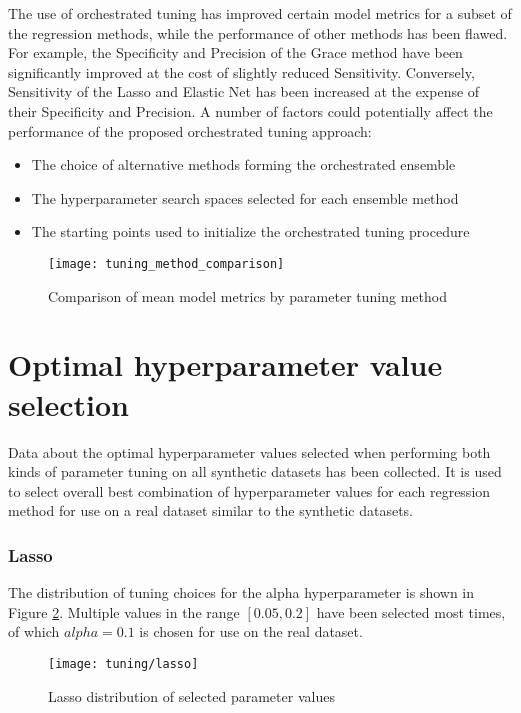 

The use of orchestrated tuning has improved certain model metrics for a subset of the regression methods, while the performance of other methods has been flawed. For example, the Specificity and Precision of the Grace method have been significantly improved at the cost of slightly reduced Sensitivity. Conversely, Sensitivity of the Lasso and Elastic Net has been increased at the expense of their Specificity and Precision. A number of factors could potentially affect the performance of the proposed orchestrated tuning approach:
\begin{itemize}
	\item The choice of alternative methods forming the orchestrated ensemble
	\item The hyperparameter search spaces selected for each ensemble method
	\item The starting points used to initialize the orchestrated tuning procedure
\end{itemize}

\begin{figure}[H]
	\centering
	\texttt{[image: tuning\_method\_comparison]}
	\caption{Comparison of mean model metrics by parameter tuning method}
	\label{fig:met_comp}
\end{figure}

\section{Optimal hyperparameter value selection} \label{sec:opt_param_val}
Data about the optimal hyperparameter values selected when performing both kinds of parameter tuning on all synthetic datasets has been collected. It is used to select overall best combination of hyperparameter values for each regression method for use on a real dataset similar to the synthetic datasets.

\subsubsection{Lasso}
The distribution of tuning choices for the alpha hyperparameter is shown in Figure \ref{fig:tun_lasso}. Multiple values in the range $[0.05, 0.2]$ have been selected most times, of which $alpha = 0.1$ is chosen for use on the real dataset.
\begin{figure}[H]
	\centering
	\texttt{[image: tuning/lasso]}
	\caption{Lasso distribution of selected parameter values}
	\label{fig:tun_lasso}
\end{figure}

